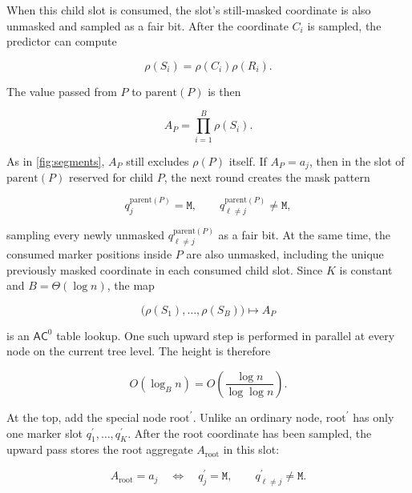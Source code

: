 \documentclass[10pt]{article}
\theoremstyle{definition}
\newcommand{\AC}{\mathsf{AC}}
\newcommand{\mask}{\mathtt{M}}
\begin{document}
When this child slot is consumed, the slot's still-masked coordinate is also
unmasked and sampled as a fair bit.  After the coordinate $C_i$ is sampled,
the predictor can compute

\begin{equation}
 \rho(S_i)=\rho(C_i)\rho(R_i).
\end{equation}

The value passed from $P$ to $\mathrm{parent}(P)$ is then

\begin{equation}
 A_P=\prod_{i=1}^{B}\rho(S_i).
\end{equation}

As in \cref{fig:segments}, $A_P$ still excludes $\rho(P)$ itself.  If
$A_P=a_j$, then in the slot of $\mathrm{parent}(P)$ reserved for child $P$,
the next round creates the mask pattern

\begin{equation}
 q^{\mathrm{parent}(P)}_j=\mask,\qquad
 q^{\mathrm{parent}(P)}_{\ell\ne j}\ne\mask,
\end{equation}

sampling every newly unmasked
$q^{\mathrm{parent}(P)}_{\ell\ne j}$ as a fair bit.  At the same time, the
consumed marker positions inside $P$ are also unmasked, including the unique
previously masked coordinate in each consumed child slot.  Since $K$ is
constant and $B=\Theta(\log n)$, the map

\begin{equation}
 \bigl(\rho(S_1),\ldots,\rho(S_B)\bigr)\mapsto A_P
\end{equation}

is an $\AC^0$ table lookup.  One such upward step is performed
in parallel at every node on the current tree level.  The height is therefore

\begin{equation}
 O(\log_B n)=O\!\left(\frac{\log n}{\log\log n}\right).
\end{equation}

At the top, add the special node $\mathrm{root}^{\prime}$.  Unlike an
ordinary node, $\mathrm{root}^{\prime}$ has only one marker slot
$q^{\prime}_1,\ldots,q^{\prime}_K$.  After the root coordinate has been
sampled, the upward pass stores the root aggregate $A_{\mathrm{root}}$ in this
slot:

\begin{equation}
 A_{\mathrm{root}}=a_j
 \quad\Longleftrightarrow\quad
 q^{\prime}_j=\mask,\qquad q^{\prime}_{\ell\ne j}\ne\mask.
\end{equation}
\end{document}

